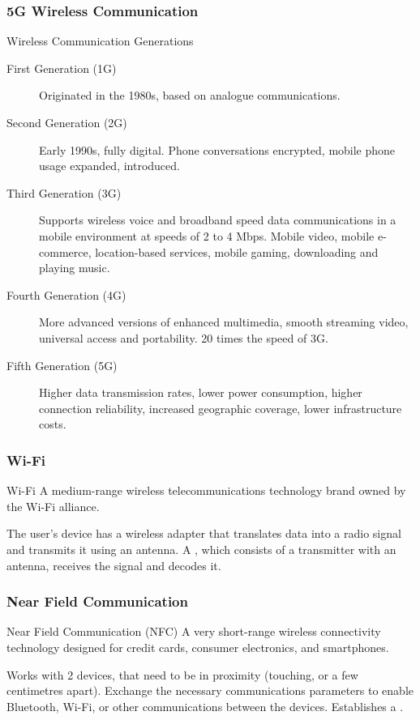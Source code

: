 \documentclass[\main/notes.tex]{subfiles}
\begin{document}
				\subsubsection{5G Wireless Communication}
					\begin{sidenote}{Wireless Communication Generations}
						\begin{description}
							\item[First Generation (1G)] Originated in the 1980s, based on analogue communications.
							\item[Second Generation (2G)] Early 1990s, fully digital. Phone conversations encrypted, mobile phone usage expanded,  introduced.
							\item[Third Generation (3G)] Supports wireless voice and broadband speed data communications in a mobile environment at speeds of 2 to 4 Mbps. Mobile video, mobile e-commerce, location-based services, mobile gaming, downloading and playing music.
							\item[Fourth Generation (4G)] More advanced versions of enhanced multimedia, smooth streaming video, universal access and portability. 20 times the speed of 3G.
							\item[Fifth Generation (5G)] Higher data transmission rates, lower power consumption, higher connection reliability, increased geographic coverage, lower infrastructure costs. 
						\end{description}
					\end{sidenote}
				\subsubsection{Wi-Fi}
					\begin{definition}{Wi-Fi}
						A medium-range wireless telecommunications technology brand owned by the Wi-Fi alliance.

						The user's device has a wireless adapter that translates data into a radio signal and transmits it using an antenna. A , which consists of a transmitter with an antenna, receives the signal and decodes it.
					\end{definition}
				\subsubsection{Near Field Communication}
					\begin{definition}{Near Field Communication (NFC)}
						A very short-range wireless connectivity technology designed for credit cards, consumer electronics, and smartphones.

						Works with 2 devices, that need to be in proximity (touching, or a few centimetres apart). Exchange the necessary communications parameters to enable Bluetooth, Wi-Fi, or other communications between the devices. Establishes a \concept{peer-to-peer network}.
					\end{definition}
\end{document}
